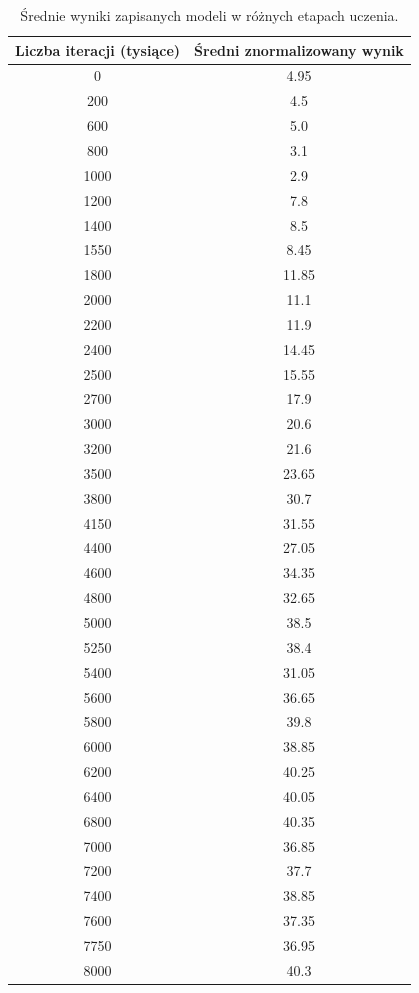 \documentclass[12pt]{article}
\begin{document}
\begin{center}
\begin{table}[H]
  \centering%
  \caption{Średnie wyniki zapisanych modeli w różnych etapach uczenia.}
\begin{tabular}{|c|c|}
\hline
\textbf{Liczba iteracji (tysiące)} & \textbf{Średni znormalizowany wynik}\\
\hline
0 &  4.95 \\
\hline
200  &  4.5 \\
\hline
600  &  5.0 \\
\hline
800  &  3.1 \\
\hline
1000  &  2.9 \\
\hline
1200  &  7.8 \\
\hline
1400  &  8.5 \\
\hline
1550  &  8.45 \\
\hline
1800  &  11.85 \\
\hline
2000  &  11.1 \\
\hline
2200  &  11.9 \\
\hline
2400  &  14.45 \\
\hline
2500  &  15.55 \\
\hline
2700  &  17.9 \\
\hline
3000  &  20.6 \\
\hline
3200  &  21.6 \\
\hline
3500  &  23.65 \\
\hline
3800  &  30.7 \\
\hline
4150  &  31.55 \\
\hline
4400  &  27.05 \\
\hline
4600  &  34.35 \\
\hline
4800  &  32.65 \\
\hline
5000  &  38.5 \\
\hline
5250  &  38.4 \\
\hline
5400  &  31.05 \\
\hline
5600  &  36.65 \\
\hline
5800  &  39.8 \\
\hline
6000  &  38.85 \\
\hline
6200  &  40.25 \\
\hline
6400  &  40.05 \\
\hline
6800  &  40.35 \\
\hline
7000  &  36.85 \\
\hline
7200  &  37.7 \\
\hline
7400  &  38.85 \\
\hline
7600  &  37.35 \\
\hline
7750  &  36.95 \\
\hline
8000  &  40.3 \\
\hline
\end{tabular}
\end{table}
\end{center}
\end{document}
